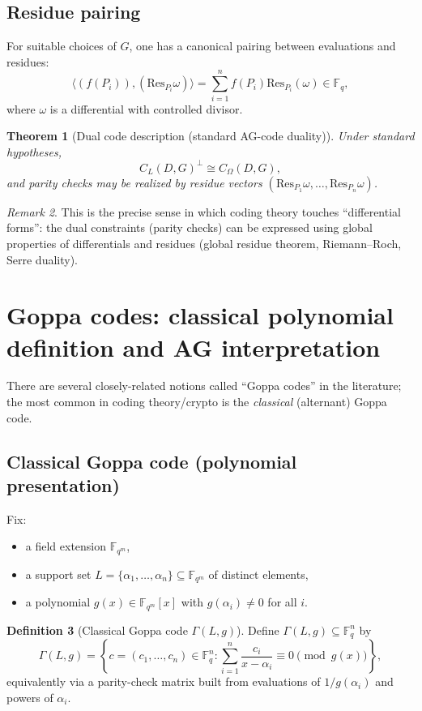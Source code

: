\documentclass[11pt]{article}
\newtheorem{theorem}{Theorem}[section]
\theoremstyle{definition}
\newtheorem{definition}[theorem]{Definition}
\theoremstyle{remark}
\newtheorem{remark}[theorem]{Remark}
\newcommand{\F}{\mathbb{F}}
\newcommand{\Res}{\mathrm{Res}}
\begin{document}
	\subsection{Residue pairing}
	For suitable choices of \(G\), one has a canonical pairing between evaluations and residues:
	\[
	\langle (f(P_i)), (\Res_{P_i}\omega)\rangle = \sum_{i=1}^n f(P_i)\Res_{P_i}(\omega)\in \F_q,
	\]
	where \(\omega\) is a differential with controlled divisor.
	
	\begin{theorem}[Dual code description (standard AG-code duality)]
		Under standard hypotheses,
		\[
		C_L(D,G)^\perp \cong C_\Omega(D,G),
		\]
		and parity checks may be realized by residue vectors \((\Res_{P_1}\omega,\dots,\Res_{P_n}\omega)\).
	\end{theorem}
	
	\begin{remark}
		This is the precise sense in which coding theory touches ``differential forms'':
		the dual constraints (parity checks) can be expressed using global properties of differentials and residues
		(global residue theorem, Riemann--Roch, Serre duality).
	\end{remark}
	
	\section{Goppa codes: classical polynomial definition and AG interpretation}
	There are several closely-related notions called ``Goppa codes'' in the literature; the most common in coding theory/crypto is the \emph{classical} (alternant) Goppa code.
	
	\subsection{Classical Goppa code (polynomial presentation)}
	Fix:
	\begin{itemize}
		\item a field extension \(\F_{q^m}\),
		\item a support set \(L=\{\alpha_1,\dots,\alpha_n\}\subseteq \F_{q^m}\) of distinct elements,
		\item a polynomial \(g(x)\in \F_{q^m}[x]\) with \(g(\alpha_i)\neq 0\) for all \(i\).
	\end{itemize}
	
	\begin{definition}[Classical Goppa code \(\Gamma(L,g)\)]
		Define \(\Gamma(L,g)\subseteq \F_q^n\) by
		\[
		\Gamma(L,g)=\left\{c=(c_1,\dots,c_n)\in \F_q^n:
		\sum_{i=1}^n \frac{c_i}{x-\alpha_i}\equiv 0 \pmod{g(x)} \right\},
		\]
		equivalently via a parity-check matrix built from evaluations of \(1/g(\alpha_i)\) and powers of \(\alpha_i\).
	\end{definition}
	
\end{document}
